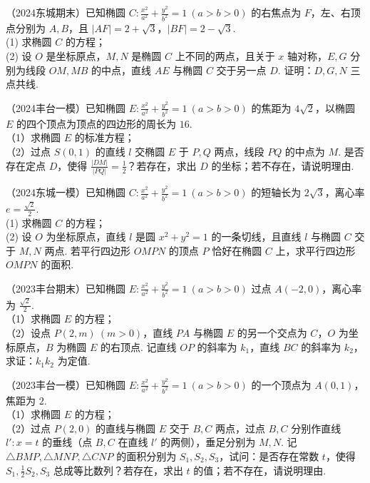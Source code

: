 \begin{exercise} %
（2024东城期末）已知椭圆 $C:\frac{x^{2}}{a^{2}}+\frac{y^{2}}{b^{2}}=1\ (a>b>0)$ 的右焦点为 $F$，左、右顶点分别为 $A,B$，且 $|AF|=2+\sqrt{3}$，$|BF|=2-\sqrt{3}$.\\
(1) 求椭圆 $C$ 的方程；\\
(2) 设 $O$ 是坐标原点，$M,N$ 是椭圆 $C$ 上不同的两点，且关于 $x$ 轴对称，$E,G$ 分别为线段 $OM,MB$ 的中点，直线 $AE$ 与椭圆 $C$ 交于另一点 $D$. 证明：$D,G,N$ 三点共线.

\end{exercise}

\begin{exercise} %
（2024丰台一模）已知椭圆 $E:\frac{x^2}{a^2}+\frac{y^2}{b^2}=1\ (a>b>0)$ 的焦距为 $4\sqrt{2}$，以椭圆 $E$ 的四个顶点为顶点的四边形的周长为 $16$.\\
（1）求椭圆 $E$ 的标准方程；\\
（2）过点 $S(0,1)$ 的直线 $l$ 交椭圆 $E$ 于 $P,Q$ 两点，线段 $PQ$ 的中点为 $M$. 是否存在定点 $D$，使得 $\frac{\lvert DM\rvert}{\lvert PQ\rvert}=\frac{1}{2}$？若存在，求出 $D$ 的坐标；若不存在，请说明理由.
\end{exercise}

\begin{exercise} %
（2024东城一模）已知椭圆 $C:\frac{x^{2}}{a^{2}}+\frac{y^{2}}{b^{2}}=1\ (a>b>0)$ 的短轴长为 $2\sqrt{3}$，离心率 $e=\frac{\sqrt{2}}{2}$.\\
(1) 求椭圆 $C$ 的方程；\\
(2) 设 $O$ 为坐标原点，直线 $l$ 是圆 $x^{2}+y^{2}=1$ 的一条切线，且直线 $l$ 与椭圆 $C$ 交于 $M,N$ 两点. 若平行四边形 $OMPN$ 的顶点 $P$ 恰好在椭圆 $C$ 上，求平行四边形 $OMPN$ 的面积.
\end{exercise}

\begin{exercise} %
（2023丰台期末）已知椭圆 $E:\frac{x^2}{a^2}+\frac{y^2}{b^2}=1\ (a>b>0)$ 过点 $A(-2,0)$，离心率为 $\frac{\sqrt{2}}{2}$.\\
（1）求椭圆 $E$ 的方程；\\
（2）设点 $P(2,m)\ (m>0)$，直线 $PA$ 与椭圆 $E$ 的另一个交点为 $C$，$O$ 为坐标原点，$B$ 为椭圆 $E$ 的右顶点. 记直线 $OP$ 的斜率为 $k_1$，直线 $BC$ 的斜率为 $k_2$，求证：$k_1k_2$ 为定值.
\end{exercise}

\begin{exercise} %
（2023丰台一模）已知椭圆 $E:\frac{x^2}{a^2}+\frac{y^2}{b^2}=1\ (a>b>0)$ 的一个顶点为 $A(0,1)$，焦距为 $2$.\\
（1）求椭圆 $E$ 的方程；\\
（2）过点 $P(2,0)$ 的直线与椭圆 $E$ 交于 $B,C$ 两点，过点 $B,C$ 分别作直线 $l':x=t$ 的垂线（点 $B,C$ 在直线 $l'$ 的两侧），垂足分别为 $M,N$. 记 $\triangle BMP,\triangle MNP,\triangle CNP$ 的面积分别为 $S_1,S_2,S_3$，试问：是否存在常数 $t$，使得 $S_1,\frac{1}{2}S_2,S_3$ 总成等比数列？若存在，求出 $t$ 的值；若不存在，请说明理由.
\end{exercise}

